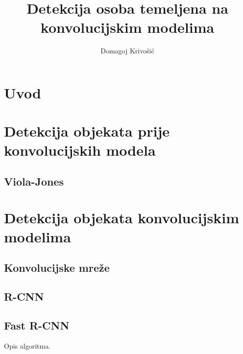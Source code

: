 \documentclass[times, utf8, diplomski]{fer}
\begin{document}

\title{Detekcija osoba temeljena na konvolucijskim modelima}

\author{Domagoj Krivošić}

\maketitle

\izvornik

\zahvala{}

\tableofcontents

\chapter{Uvod}


\chapter{Detekcija objekata prije konvolucijskih modela}


\section{Viola-Jones}


\chapter{Detekcija objekata konvolucijskim modelima}


\section{Konvolucijske mreže}



\section{R-CNN}


\section{Fast R-CNN}
Opis algoritma.
\end{document}

